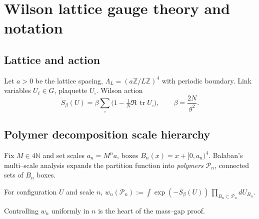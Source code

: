 \section{Wilson lattice gauge theory and notation}\label{YM:setup}

\subsection{Lattice and action}
Let $a>0$ be the lattice spacing, $\Lambda_{L}=(a\mathbb Z/L\mathbb Z)^{4}$
with periodic boundary.  Link variables
$U_{\ell}\in G$, plaquette $U_{\square}$.
Wilson action
\[
S_{\beta}(U) = \beta \sum_{\square}
  \bigl(1-\tfrac1N\Re\,\operatorname{tr}U_{\square}\bigr),
\qquad \beta=\frac{2N}{g^{2}}.
\]

\subsection{Polymer decomposition scale hierarchy}
Fix $M\in 4\mathbb N$ and set scales
$a_{n}=M^{n}a$, boxes
$B_{n}(x)=x+[0,a_{n})^{4}$.  Balaban's multi–scale analysis expands the
partition function into \emph{polymers} $\mathcal P_{n}$, connected sets
of $B_{n}$ boxes.

\begin{definition}
For configuration $U$ and scale $n$,
\(
w_{n}(\mathcal P_{n}) := 
  \int\!\exp(-S_{\beta}(U))\,
  \prod_{B_{n}\subset\mathcal P_{n}}\!dU_{B_{n}}.
\)
\end{definition}

Controlling $w_{n}$ uniformly in $n$ is the heart of the mass–gap proof. 